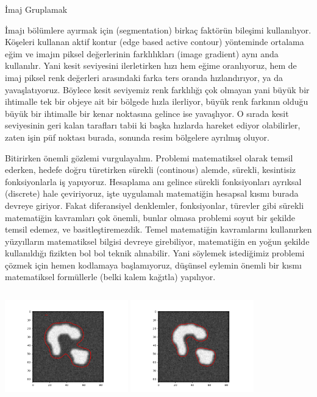 \documentclass[12pt,fleqn]{article}\usepackage{../../common}
\begin{document}
İmaj Gruplamak

İmajı bölümlere ayırmak için (segmentation) birkaç faktörün bileşimi
kullanılıyor. Köşeleri kullanan aktif kontur (edge based active contour)
yönteminde ortalama eğim ve imajın piksel değerlerinin farklılıkları (image
gradient) aynı anda kullanılır. Yani kesit seviyesini ilerletirken hızı hem
eğime oranlıyoruz, hem de imaj piksel renk değerleri arasındaki farka ters
oranda hızlandırıyor, ya da yavaşlatıyoruz. Böylece kesit seviyemiz renk
farklılığı çok olmayan yani büyük bir ihtimalle tek bir objeye ait bir
bölgede hızla ilerliyor, büyük renk farkının olduğu büyük bir ihtimalle bir
kenar noktasına gelince ise yavaşlıyor. O sırada kesit seviyesinin geri
kalan tarafları tabii ki başka hızlarda hareket ediyor olabilirler, zaten
işin püf noktası burada, sonunda resim bölgelere ayrılmış oluyor.

Bitirirken önemli gözlemi vurgulayalım. Problemi matematiksel olarak temsil
ederken, hedefe doğru türetirken sürekli (continous) alemde, sürekli,
kesintisiz fonksiyonlarla iş yapıyoruz. Hesaplama anı gelince sürekli
fonksiyonları ayrıksal (discrete) hale çeviriyoruz, işte uygulamalı
matematiğin hesapsal kısmı burada devreye giriyor. Fakat diferansiyel
denklemler, fonksiyonlar, türevler gibi sürekli matematiğin kavramları çok
önemli, bunlar olmasa problemi soyut bir şekilde temsil edemez, ve
basitleştiremezdik. Temel matematiğin kavramlarını kullanırken yüzyılların
matematiksel bilgisi devreye girebiliyor, matematiğin en yoğun şekilde
kullanıldığı fizikten bol bol teknik alınabilir. Yani söylemek istediğimiz
problemi çözmek için hemen kodlamaya başlamıyoruz, düşünsel eylemin önemli
bir kısmı matematiksel formüllerle (belki kalem kağıtla) yapılıyor.

\inputminted[fontsize=\footnotesize]{python}{levelset2o.py}

\includegraphics[height=4cm]{img1/level_2_040.png}
\includegraphics[height=4cm]{img1/level_2_100.png}
\end{document}
